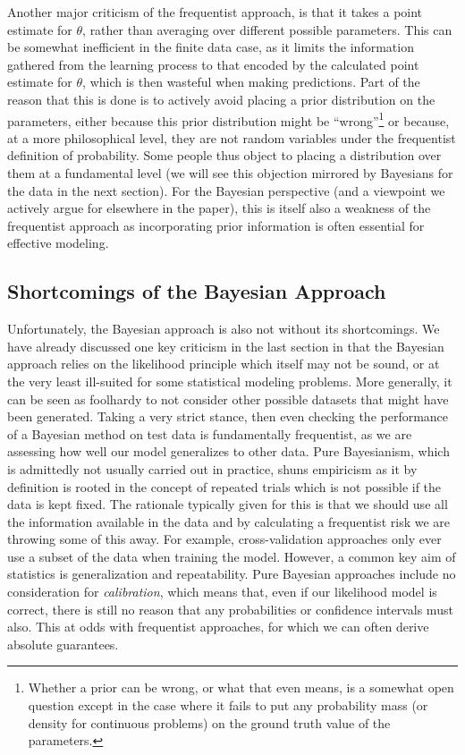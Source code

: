 Another major criticism of the frequentist approach, is that it takes a point estimate for $\theta$, rather than averaging
over different possible parameters.  This can be somewhat inefficient in the finite data case, as it limits the information
gathered from the learning process to that encoded by the calculated point estimate for $\theta$, which is then wasteful
when making predictions.  Part of the reason that this
is done is to actively avoid placing a prior distribution on the parameters, either because this prior distribution might
be ``wrong''\footnote{Whether a prior can be wrong, or what that even means, is a somewhat open question except in the
	case where it fails to put any probability mass (or density for continuous problems) on the ground truth value of
	the parameters.} or because, at a more philosophical level, they are not random variables under the frequentist definition
of probability.  Some people thus object to placing a distribution over them at a fundamental level (we will see this objection
mirrored by Bayesians for the data in the next section).  For the Bayesian perspective (and a viewpoint we actively 
argue for elsewhere in the paper), this is itself also a weakness of the frequentist approach as incorporating prior
information is often essential for effective modeling.


\subsection{Shortcomings of the Bayesian Approach}
\label{sec:bayes:religion:bayes}

Unfortunately, the Bayesian approach is also not without its shortcomings.  We have already discussed one
key criticism in the last section in that the Bayesian approach relies on the likelihood principle which itself may not
be sound, or at the very least ill-suited for some statistical modeling problems.  More generally, it can be seen as
foolhardy to not consider other possible datasets that might have been generated.  Taking a very strict stance, then
even checking the performance of a Bayesian method on test data is fundamentally frequentist, as we are assessing how
well our model generalizes to other data.  Pure Bayesianism, which is admittedly not usually carried out in practice, shuns
empiricism as it by definition is rooted in the concept of repeated trials which is not possible if the data is kept fixed.
The rationale typically given for
this is that we should use all the information available in the data and by calculating a frequentist risk we are throwing
some of this away.  For example, cross-validation approaches only ever use a subset of the data when training the model.
However, a common key aim of statistics is generalization and repeatability.  Pure Bayesian approaches include no
consideration for \emph{calibration}, which means that, even if our likelihood model is correct, there is still no reason
that any probabilities or confidence intervals must also.  This at odds with frequentist approaches, for which
we can often derive absolute guarantees.

